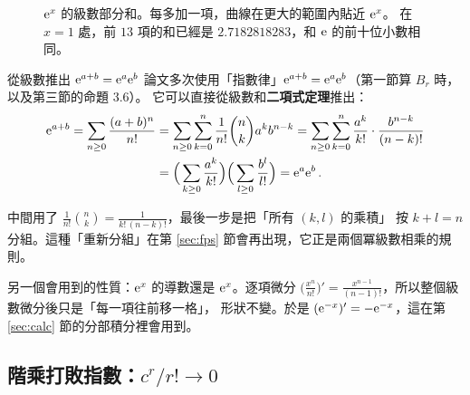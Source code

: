 \begin{figure}[htbp]
\centering
{}
\caption{$\mathrm{e}^x$ 的級數部分和。每多加一項，曲線在更大的範圍內貼近 $\mathrm{e}^x$。
在 $x=1$ 處，前 $13$ 項的和已經是 $2.7182818283$，和 $\mathrm{e}$ 的前十位小數相同。}
\label{fig:expseries}
\end{figure}

\begin{prereq}{從級數推出 $\mathrm{e}^{a+b}=\mathrm{e}^a\mathrm{e}^b$}
論文多次使用「指數律」$\mathrm{e}^{a+b}=\mathrm{e}^{a}\mathrm{e}^{b}$（第一節算 $B_r$ 時，以及第三節的命題 3.6）。
它可以直接從級數和\textbf{二項式定理}推出：
\begin{align*}
  \mathrm{e}^{a+b}=\sum_{n\ge0}\frac{(a+b)^n}{n!}
  &=\sum_{n\ge0}\sum_{k=0}^{n}\frac{1}{n!}\binom{n}{k}a^kb^{n-k}
  =\sum_{n\ge0}\sum_{k=0}^{n}\frac{a^k}{k!}\cdot\frac{b^{n-k}}{(n-k)!}\\
  &=\Big(\sum_{k\ge0}\frac{a^k}{k!}\Big)\Big(\sum_{l\ge0}\frac{b^l}{l!}\Big)=\mathrm{e}^a\mathrm{e}^b\,.
\end{align*}

中間用了 $\frac{1}{n!}\binom nk=\frac{1}{k!\,(n-k)!}$，最後一步是把「所有 $(k,l)$ 的乘積」
按 $k+l=n$ 分組。這種「重新分組」在第 \ref{sec:fps} 節會再出現，它正是兩個冪級數相乘的規則。
\end{prereq}

另一個會用到的性質：$\mathrm{e}^x$ 的導數還是 $\mathrm{e}^x$。逐項微分
$\big(\tfrac{x^n}{n!}\big)'=\tfrac{x^{n-1}}{(n-1)!}$，所以整個級數微分後只是「每一項往前移一格」，
形狀不變。於是 $(\mathrm{e}^{-x})'=-\mathrm{e}^{-x}$，這在第 \ref{sec:calc} 節的分部積分裡會用到。

\subsection{階乘打敗指數：$c^r/r!\to0$}\label{sec:factorial}

